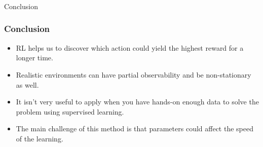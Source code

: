 \begin{frame}[fragile]\frametitle{}
\begin{center}
{\Large Conclusion}
\end{center}
\end{frame}

\begin{frame}[fragile]\frametitle{Conclusion}

\begin{itemize}
\item RL helps us to discover which action could yield the highest reward for a longer time. 
\item Realistic environments can have partial observability and be non-stationary as well. 
\item It isn't very useful to apply when you have hands-on enough data to solve the problem using supervised learning. \item The main challenge of this method is that parameters could affect the speed of the learning.
\end{itemize}
\end{frame}





